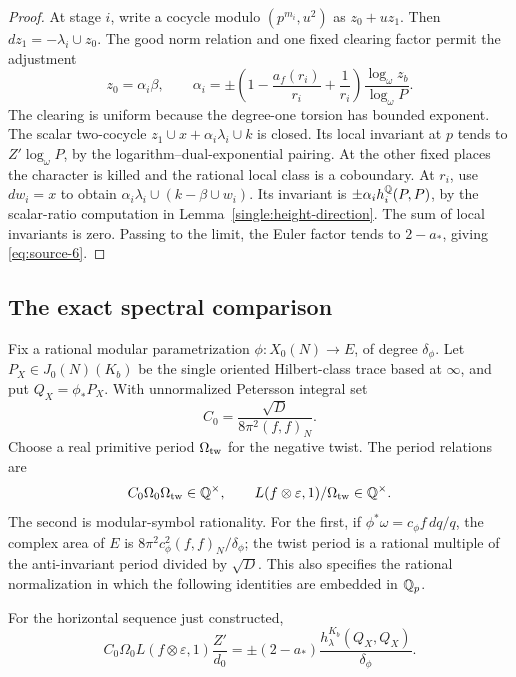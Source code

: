 \begin{proof}
At stage \(i\), write a cocycle modulo \((p^{m_i},u^2)\) as
\(z_0+uz_1\).  Then \(dz_1=-\lambda_i\cup z_0\).
The good norm relation and one fixed clearing factor permit
the adjustment
\[
 z_0=\alpha_i\beta,\qquad
 \alpha_i=\pm\left(1-\frac{a_f(r_i)}{r_i}+\frac1{r_i}\right)
                              \frac{\log_\omega z_b}{\log_\omega P}.
\]
The clearing is uniform because the degree-one torsion has
bounded exponent.  The scalar two-cocycle
\(z_1\cup x+\alpha_i\lambda_i\cup k\) is closed.  Its local
invariant at \(p\) tends to \(Z'\log_\omega P\), by the
logarithm--dual-exponential pairing.  At the other fixed places
the character is killed and the rational local class is a
coboundary.  At \(r_i\), use \(dw_i=x\) to obtain
\(\alpha_i\lambda_i\cup(k-\beta\cup w_i)\).  Its invariant is
\(\pm\alpha_i h_i^\mathbb Q(P,P)\), by the scalar-ratio computation
in Lemma~\ref{single:height-direction}.  The sum of local
invariants is zero.  Passing to the limit, the Euler factor
tends to \(2-a_*\), giving \eqref{eq:source-6}.
\end{proof}

\subsection{The exact spectral comparison}

Fix a rational modular parametrization \(\phi:X_0(N)\to E\),
of degree \(\delta_\phi\).  Let \(P_X\in J_0(N)(K_b)\) be the
single oriented Hilbert-class trace based at \(\infty\), and
put \(Q_X=\phi_*P_X\).  With unnormalized Petersson integral set
\[
                        C_0=\frac{\sqrt D}{8\pi^2(f,f)_N}.
\]
Choose a real primitive period \(\Omega_{\rm tw}\) for the
negative twist.  The period relations are
\[
 C_0\Omega_0\Omega_{\rm tw}\in\mathbb Q^\times,
 \qquad L(f\otimes\varepsilon,1)/\Omega_{\rm tw}\in\mathbb Q^\times.
\]
The second is modular-symbol rationality.  For the first, if
\(\phi^*\omega=c_\phi f\,dq/q\), the complex area of \(E\)
is \(8\pi^2c_\phi^2(f,f)_N/\delta_\phi\); the twist period is a
rational multiple of the anti-invariant period divided by
\(\sqrt D\).  This also specifies the rational normalization
in which the following identities are embedded in \(\mathbb Q_p\).

\begin{lemma}\label{single:spectral}
For the horizontal sequence just constructed,
\begin{equation}
 C_0\Omega_0L(f\otimes\varepsilon,1)\frac{Z'}{d_0}
       =\pm(2-a_*)\frac{h_\lambda^{K_b}(Q_X,Q_X)}{\delta_\phi}.
       \tag{7}\label{eq:source-7}
\end{equation}
\end{lemma}

